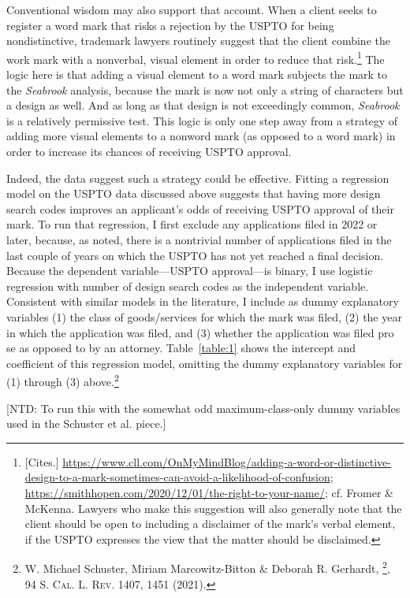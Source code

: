 \documentclass[letterpaper, 11pt, oneside]{article}
\begin{document}
Conventional wisdom may also support that account. When a client seeks to register a word mark that risks a rejection by the USPTO for being nondistinctive, trademark lawyers routinely suggest that the client combine the work mark with a nonverbal, visual element in order to reduce that risk.\footnote{[Cites.] \url{https://www.cll.com/OnMyMindBlog/adding-a-word-or-distinctive-design-to-a-mark-sometimes-can-avoid-a-likelihood-of-confusion}; \url{https://smithhopen.com/2020/12/01/the-right-to-your-name/}; cf. Fromer \& McKenna. Lawyers who make this suggestion will also generally note that the client should be open to including a disclaimer of the mark's verbal element, if the USPTO expresses the view that the matter should be disclaimed.} The logic here is that adding a visual element to a word mark subjects the mark to the \textit{Seabrook} analysis, because the mark is now not only a string of characters but a design as well. And as long as that design is not exceedingly common, \textit{Seabrook} is a relatively permissive test. This logic is only one step away from a strategy of adding more visual elements to a nonword mark (as opposed to a word mark) in order to increase its chances of receiving USPTO approval.

Indeed, the data suggest such a strategy could be effective. Fitting a regression model on the USPTO data discussed above suggests that having more design search codes improves an applicant's odds of receiving USPTO approval of their mark. To run that regression, I first exclude any applications filed in 2022 or later, because, as noted, there is a nontrivial number of applications filed in the last couple of years on which the USPTO has not yet reached a final decision. Because the dependent variable—USPTO approval—is binary, I use logistic regression with number of design search codes as the independent variable. Consistent with similar models in the literature, I include as dummy explanatory variables (1) the class of goods/services for which the mark was filed, (2) the year in which the application was filed, and (3) whether the application was filed pro se as opposed to by an attorney. Table~\ref{table:1} shows the intercept and coefficient of this regression model, omitting the dummy explanatory variables for (1) through (3) above.\footnote{W. Michael Schuster, Miriam Marcowitz-Bitton \& Deborah R. Gerhardt, \footnote{An Empirical Study of Gender and Race in Trademark Prosecution}, 94 \textsc{S. Cal. L. Rev.} 1407, 1451 (2021).}

[NTD: To run this with the somewhat odd maximum-class-only dummy variables used in the Schuster et al. piece.]
\end{document}

